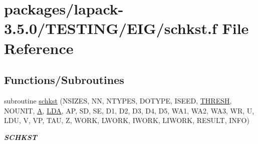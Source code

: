 \hypertarget{schkst_8f}{}\section{packages/lapack-\/3.5.0/\+T\+E\+S\+T\+I\+N\+G/\+E\+I\+G/schkst.f File Reference}
\label{schkst_8f}
\subsection*{Functions/\+Subroutines}
\begin{DoxyCompactItemize}
\item 
subroutine \hyperlink{group__single__eig_ga78dcfb18a5c0e962c63effd1914f11a3}{schkst} (N\+S\+I\+Z\+E\+S, N\+N, N\+T\+Y\+P\+E\+S, D\+O\+T\+Y\+P\+E, I\+S\+E\+E\+D, \hyperlink{zlaqgs_8c_a0656018abfc9fa2821827415f5d5ea57}{T\+H\+R\+E\+S\+H}, N\+O\+U\+N\+I\+T, \hyperlink{classA}{A}, \hyperlink{example__user_8c_ae946da542ce0db94dced19b2ecefd1aa}{L\+D\+A}, A\+P, S\+D, S\+E, D1, D2, D3, D4, D5, W\+A1, W\+A2, W\+A3, W\+R, U, L\+D\+U, V, V\+P, T\+A\+U, Z, W\+O\+R\+K, L\+W\+O\+R\+K, I\+W\+O\+R\+K, L\+I\+W\+O\+R\+K, R\+E\+S\+U\+L\+T, I\+N\+F\+O)
\begin{DoxyCompactList}\small\item\em {\bfseries S\+C\+H\+K\+S\+T} \end{DoxyCompactList}\end{DoxyCompactItemize}
